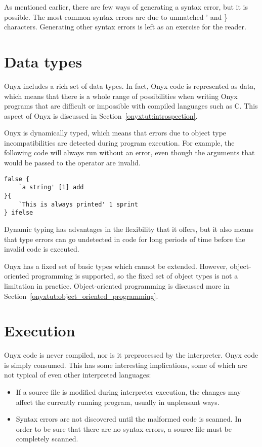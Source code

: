 As mentioned earlier, there are few ways of generating a syntax error, but it is
possible.  The most common syntax errors are due to unmatched ' and \}
characters.  Generating other syntax errors is left as an exercise for the
reader.

\section{Data types}

Onyx includes a rich set of data types.  In fact, Onyx code is represented as
data, which means that there is a whole range of possibilities when writing Onyx
programs that are difficult or impossible with compiled languages such as C.
This aspect of Onyx is discussed in Section~\ref{onyxtut:introspection}.

Onyx is dynamically typed, which means that errors due to object type
incompatibilities are detected during program execution.  For example, the
following code will always run without an error, even though the arguments that
would be passed to the  operator are
invalid.

\begin{verbatim}
false {
    `a string' [1] add
}{
    `This is always printed' 1 sprint
} ifelse
\end{verbatim}

Dynamic typing has advantages in the flexibility that it offers, but it also
means that type errors can go undetected in code for long periods of time before
the invalid code is executed.

Onyx has a fixed set of basic types which cannot be extended.  However,
object-oriented programming is supported, so the fixed set of object types is
not a limitation in practice.  Object-oriented programming is discussed more in
Section~\ref{onyxtut:object_oriented_programming}.

\section{Execution}

Onyx code is never compiled, nor is it preprocessed by the interpreter.  Onyx
code is simply consumed.  This has some interesting implications, some of which
are not typical of even other interpreted languages:

\begin{itemize}
\item{If a source file is modified during interpreter execution, the changes may
affect the currently running program, usually in unpleasant ways.}
\item{Syntax errors are not discovered until the malformed code is scanned.  In
order to be sure that there are no syntax errors, a source file must be
completely scanned.}
\end{itemize}

